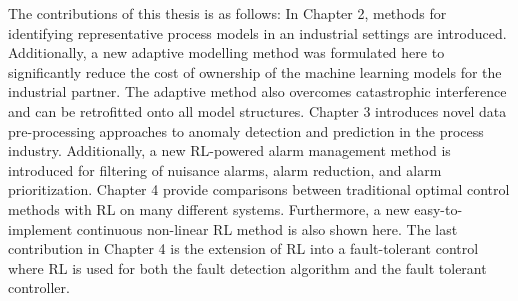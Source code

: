 The contributions of this thesis is as follows: In Chapter 2, methods for identifying representative process models in an industrial settings are introduced. Additionally, a new adaptive modelling method was formulated here to significantly reduce the cost of ownership of the machine learning models for the industrial partner. The adaptive method also overcomes catastrophic interference and can be retrofitted onto all model structures. Chapter 3 introduces novel data pre-processing approaches to anomaly detection and prediction in the process industry.  Additionally, a new RL-powered alarm management method is introduced for filtering of nuisance alarms, alarm reduction, and alarm prioritization.  Chapter 4 provide comparisons between traditional optimal control methods with RL on many different systems. Furthermore, a new easy-to-implement continuous non-linear RL method is also shown here.  The last contribution in Chapter 4 is the extension of RL into a fault-tolerant control where RL is used for both the fault detection algorithm and the fault tolerant controller. 















